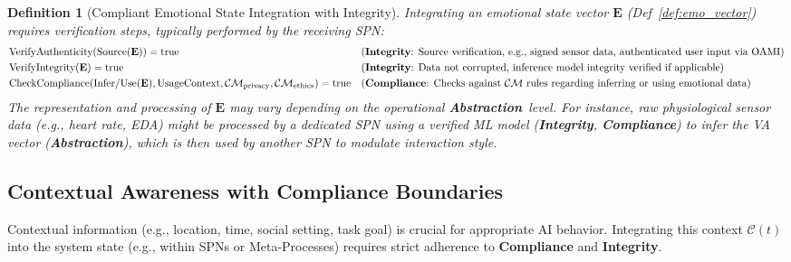 \documentclass[12pt,a4paper]{report}
\newtheorem{definition}{Definition}[section]
\newcommand{\Integrity}{\textbf{Integrity}}
\newcommand{\Abstraction}{\textbf{Abstraction}}
\begin{document}
	\begin{definition}[Compliant Emotional State Integration with Integrity]
		\label{def:emo_integration}
		Integrating an emotional state vector $\mathbf{E}$ (Def~\ref{def:emo_vector}) requires verification steps, typically performed by the receiving SPN:
		\begin{align}
			&\text{VerifyAuthenticity}(\text{Source}(\mathbf{E})) = \text{true} && \text{(\Integrity: Source verification, e.g., signed sensor data, authenticated user input via OAMI)} \\
			&\text{VerifyIntegrity}(\mathbf{E}) = \text{true} && \text{(\Integrity: Data not corrupted, inference model integrity verified if applicable)} \\
			&\text{CheckCompliance}(\text{Infer/Use}(\mathbf{E}), \text{UsageContext}, \mathcal{CM}_{\text{privacy}}, \mathcal{CM}_{\text{ethics}}) = \text{true} && \text{(\textbf{Compliance}: Checks against } \mathcal{CM} \text{ rules regarding inferring or using emotional data)}
		\end{align}
		The representation and processing of $\mathbf{E}$ may vary depending on the operational \Abstraction\ level. For instance, raw physiological sensor data (e.g., heart rate, EDA) might be processed by a dedicated SPN using a verified ML model (\Integrity, \textbf{Compliance}) to infer the VA vector (\Abstraction), which is then used by another SPN to modulate interaction style.
	\end{definition}
	
	
	\subsection{Contextual Awareness with Compliance Boundaries}
	\label{sec:2-8-2}
	
	Contextual information (e.g., location, time, social setting, task goal) is crucial for appropriate AI behavior. Integrating this context $\mathcal{C}(t)$ into the system state (e.g., within SPNs or Meta-Processes) requires strict adherence to \textbf{Compliance} and \Integrity.
	
\end{document}

